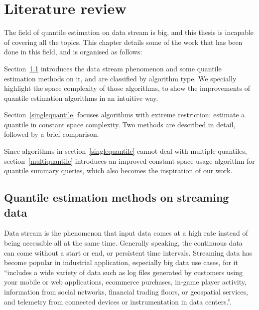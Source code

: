% 



% 
\chapter{Literature review}
\label{ch: literature_review}


The field of quantile estimation on data stream is big, and this thesis is incapable of covering all the topics.
This chapter details some of the work that has been done in this field, and is organised as follows:

Section~\ref{streamingdata} introduces the data stream phenomenon and some quantile estimation methods on it, and are classified by algorithm type. We specially highlight the space complexity of those algorithms, to show the improvements of quantile estimation algorithms in an intuitive way.

Section~\ref{singlequantile} focuses algorithms with extreme restriction: estimate a quantile in constant space complexity. Two methods are described in detail, followed by a brief comparison.

Since algorithms in section~\ref{singlequantile} cannot deal with multiple quantiles, section~\ref{multiquantile} introduces an improved constant space usage algorithm for quantile summary queries, which also becomes the inspiration of our work.

\section{Quantile estimation methods on streaming data}
\label{streamingdata}
Data stream is the phenomenon that input data comes at a high rate instead of being accessible all at the same time\cite{muthukrishnanDataStreamsAlgorithms2005}.
Generally speaking, the continuous data can come without a start or end, or persistent time intervals.
Streaming data has become popular in industrial application, especially big data use cases, for it
``includes a wide variety of data such as log files generated by customers using your mobile or web applications, ecommerce purchases, in-game player activity, information from social networks, financial trading floors, or geospatial services, and telemetry from connected devices or instrumentation in data centers.''\cite{WhatStreamingData}.

